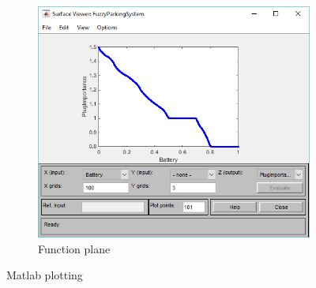 \begin{figure}
	\begin{subfigure}{.5\textwidth}
		\includegraphics[width=1\textwidth]{img/Fuzzy/output.PNG}
		\caption{Function plane}
		\label{fig:subim3}
	\end{subfigure}
	
	\caption{Matlab plotting}
	\label{fig:image1}
\end{figure}
